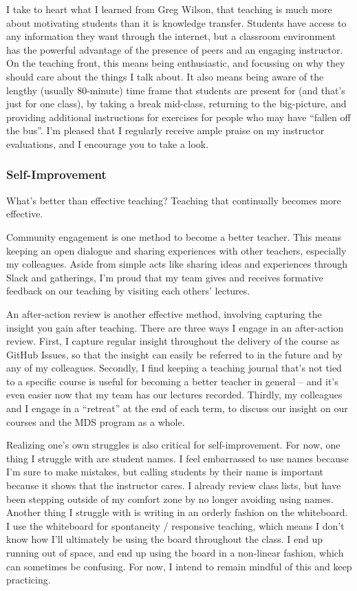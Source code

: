 \documentclass[]{article}
\begin{document}
I take to heart what I learned from Greg Wilson, that teaching is much more about motivating students than it is knowledge transfer. Students have access to any information they want through the internet, but a classroom environment has the powerful advantage of the presence of peers and an engaging instructor. On the teaching front, this means being enthusiastic, and focussing on why they should care about the things I talk about. It also means being aware of the lengthy (usually 80-minute) time frame that students are present for (and that's just for one class), by taking a break mid-class, returning to the big-picture, and providing additional instructions for exercises for people who may have ``fallen off the bus''. I'm pleased that I regularly receive ample praise on my instructor evaluations, and I encourage you to take a look.

\hypertarget{self-improvement}{%
\subsubsection{Self-Improvement}\label{self-improvement}}

What's better than effective teaching? Teaching that continually becomes more effective.

Community engagement is one method to become a better teacher. This means keeping an open dialogue and sharing experiences with other teachers, especially my colleagues. Aside from simple acts like sharing ideas and experiences through Slack and gatherings, I'm proud that my team gives and receives formative feedback on our teaching by visiting each others' lectures.

An after-action review is another effective method, involving capturing the insight you gain after teaching. There are three ways I engage in an after-action review. First, I capture regular insight throughout the delivery of the course as GitHub Issues, so that the insight can easily be referred to in the future and by any of my colleagues. Secondly, I find keeping a teaching journal that's not tied to a specific course is useful for becoming a better teacher in general -- and it's even easier now that my team has our lectures recorded. Thirdly, my colleagues and I engage in a ``retreat'' at the end of each term, to discuss our insight on our courses and the MDS program as a whole.

Realizing one's own struggles is also critical for self-improvement. For now, one thing I struggle with are student names. I feel embarrassed to use names because I'm sure to make mistakes, but calling students by their name is important because it shows that the instructor cares. I already review class lists, but have been stepping outside of my comfort zone by no longer avoiding using names. Another thing I struggle with is writing in an orderly fashion on the whiteboard. I use the whiteboard for spontaneity / responsive teaching, which means I don't know how I'll ultimately be using the board throughout the class. I end up running out of space, and end up using the board in a non-linear fashion, which can sometimes be confusing. For now, I intend to remain mindful of this and keep practicing.
\end{document}
